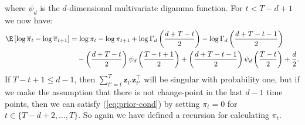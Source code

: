 where $\psi_d$ is the $d$-dimensional multivariate digamma function. For $t < T-d+1$ we now have:
\begin{align*}
    \E\left[\log\overline{\pi}_t - \log \overline{\pi}_{t+1} \right] &= \log \pi_t- \log \pi_{t+1} +\log \Gamma_d\left(\frac{d + T-t}{2}\right) - \log \Gamma_d\left(\frac{d + T-t-1}{2}\right) \\
    &\quad - \left(\frac{d + T - t}{2}\right)\psi_d\left(\frac{T-t+1}{2}\right) + \left(\frac{d + T - t-1}{2}\right)\psi_d\left(\frac{T-t}{2}\right) + \frac{d}{2}.
\end{align*}
If $T-t+1 \leq d-1$, then $\sum_{t'=t}^{T} \mathbf{z}_{t'}\mathbf{z}^\intercal_{t'}$  will be singular with probability one, but if we make the assumption that there is not change-point in the last $d-1$ time points, then we can satisfy (\ref{eq:prior-cond}) by setting $\pi_t = 0$ for $t \in \{T-d+2,\ldots,T\}$. So again we have defined a recursion for calculating $\pi_t$.

